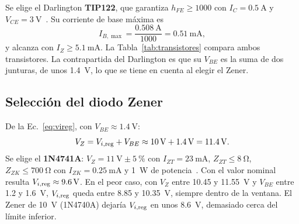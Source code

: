 Se elige el Darlington \textbf{TIP122}, que garantiza $h_{FE} \geq 1000$ con $I_C = \SI{0,5}{\ampere}$ y $V_{CE} = \SI{3}{\volt}$~\cite{tip120}. Su corriente de base máxima es
\begin{equation}
    I_{B,\max} = \frac{\SI{0,508}{\ampere}}{1000} = \SI{0,51}{\milli\ampere},
\end{equation}
y alcanza con $I_Z \geq \SI{5,1}{\milli\ampere}$. La Tabla~\ref{tab:transistores} compara ambos transistores. La contrapartida del Darlington es que su $V_{BE}$ es la suma de dos junturas, de unos \SI{1,4}{\volt}, lo que se tiene en cuenta al elegir el Zener.

\begin{table}[!htb]
\centering
\caption{Comparación de los transistores considerados~\cite{tip31,tip120}.}
\label{tab:transistores}
\end{table}

\subsection{Selección del diodo Zener}
De la Ec.~\eqref{eq:vireg}, con $V_{BE} \approx \SI{1,4}{\volt}$:
\begin{equation}
    V_Z = V_{i,\mathrm{reg}} + V_{BE} \approx \SI{10}{\volt} + \SI{1,4}{\volt} = \SI{11,4}{\volt}.
\end{equation}
Se elige el \textbf{1N4741A}: $V_Z = \SI{11}{\volt} \pm \SI{5}{\percent}$ con $I_{ZT} = \SI{23}{\milli\ampere}$, $Z_{ZT} \leq \SI{8}{\ohm}$, $Z_{ZK} \leq \SI{700}{\ohm}$ con $I_{ZK} = \SI{0,25}{\milli\ampere}$ y \SI{1}{\watt} de potencia~\cite{zener}. Con el valor nominal resulta $V_{i,\mathrm{reg}} \approx \SI{9,6}{\volt}$. En el peor caso, con $V_Z$ entre \SI{10,45}{} y \SI{11,55}{\volt} y $V_{BE}$ entre \SI{1,2}{} y \SI{1,6}{\volt}, $V_{i,\mathrm{reg}}$ queda entre \SI{8,85}{} y \SI{10,35}{\volt}, siempre dentro de la ventana. El Zener de \SI{10}{\volt} (1N4740A) dejaría $V_{i,\mathrm{reg}}$ en unos \SI{8,6}{\volt}, demasiado cerca del límite inferior.

